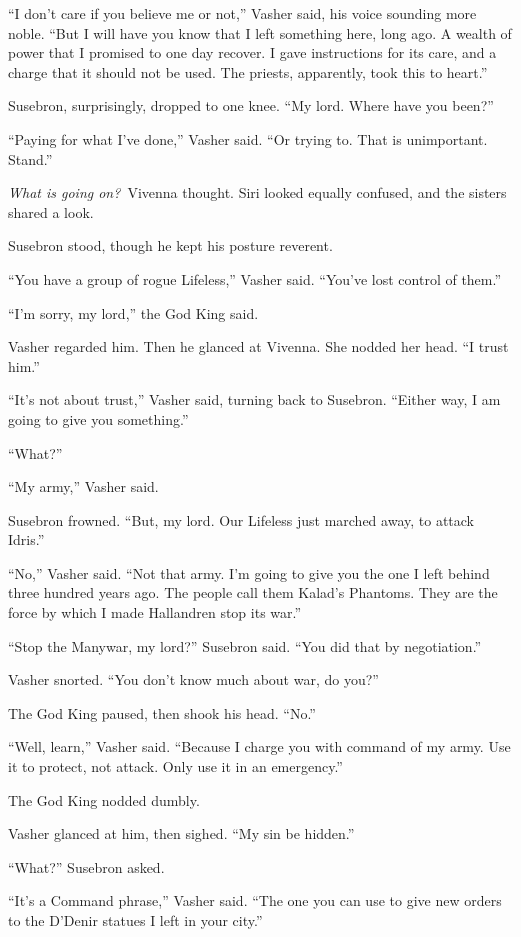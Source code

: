“I don’t care if you believe me or not,” Vasher said, his voice sounding more noble. “But I will have you know that I left something here, long ago. A wealth of power that I promised to one day recover. I gave instructions for its care, and a charge that it should not be used. The priests, apparently, took this to heart.”

Susebron, surprisingly, dropped to one knee. “My lord. Where have you been?”

“Paying for what I’ve done,” Vasher said. “Or trying to. That is unimportant. Stand.”

\textit{What is going on?}~Vivenna thought. Siri looked equally confused, and the sisters shared a look.

Susebron stood, though he kept his posture reverent.

“You have a group of rogue Lifeless,” Vasher said. “You’ve lost control of them.”

“I’m sorry, my lord,” the God King said.

Vasher regarded him. Then he glanced at Vivenna. She nodded her head. “I trust him.”

“It’s not about trust,” Vasher said, turning back to Susebron. “Either way, I am going to give you something.”

“What?”

“My army,” Vasher said.

Susebron frowned. “But, my lord. Our Lifeless just marched away, to attack Idris.”

“No,” Vasher said. “Not that army. I’m going to give you the one I left behind three hundred years ago. The people call them Kalad’s Phantoms. They are the force by which I made Hallandren stop its war.”

“Stop the Manywar, my lord?” Susebron said. “You did that by negotiation.”

Vasher snorted. “You don’t know much about war, do you?”

The God King paused, then shook his head. “No.”

“Well, learn,” Vasher said. “Because I charge you with command of my army. Use it to protect, not attack. Only use it in an emergency.”

The God King nodded dumbly.

Vasher glanced at him, then sighed. “My sin be hidden.”

“What?” Susebron asked.

“It’s a Command phrase,” Vasher said. “The one you can use to give new orders to the D’Denir statues I left in your city.”


